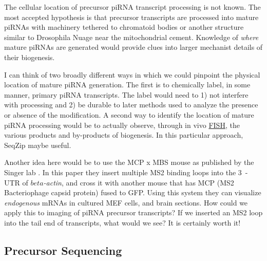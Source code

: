     The cellular location of precursor piRNA transcript processing is not known. The most accepted hypothesis is that precursor transcripts are processed into mature piRNAs with machinery tethered to chromatoid bodies \citep{Meikar2011,Meikar2014} or another structure similar to Drosophila Nuage near the mitochondrial cement. Knowledge of \textit{where} mature piRNAs are generated would provide clues into larger mechanist details of their biogenesis. 

    I can think of two broadly different ways in which we could pinpoint the physical location of mature piRNA generation. The first is to chemically label, in some manner, primary piRNA transcripts. The label would need to 1) not interfere with processing and 2) be durable to later methods used to analyze the presence or absence of the modification. A second way to identify the location of mature piRNA processing would be to actually observe, through in vivo \hyperref[hd:abrevs]{FISH}, the various products and by-products of biogenesis. In this particular approach, SeqZip maybe useful.

    Another idea here would be to use the MCP x MBS mouse as published by the Singer lab \citep{Park2014}. In this paper they insert multiple MS2 binding loops into the 3\textprime~-UTR of \textit{$beta$-actin}, and cross it with another mouse that has MCP (MS2 Bacteriophage capsid protein) fused to GFP. Using this system they can visualize \textit{endogenous} mRNAs in cultured MEF cells, and brain sections. How could we apply this to imaging of piRNA precursor transcripts? If we inserted an MS2 loop into the tail end of transcripts, what would we see? It is certainly worth it!

  \subsection{Precursor Sequencing}
    \label{Disc:subsec:Sequencing of Precursors}




